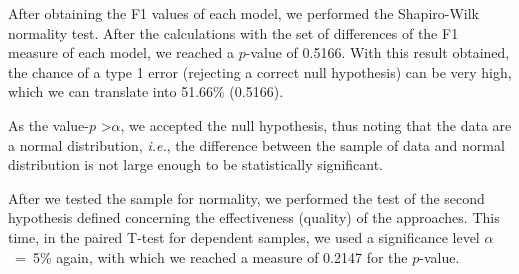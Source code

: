 After obtaining the F1 values of each model, we performed the Shapiro-Wilk normality test.
After the calculations with the set of differences of the F1 measure of each model, we reached a $p$-value of 0.5166.
With this result obtained, the chance of a type 1 error (rejecting a correct null hypothesis) can be very high, which we can translate into 51.66\% (0.5166).

As the value-$p$ \textgreater $\alpha$, we accepted the null hypothesis, thus noting that the data are a normal distribution, \textit{i.e.}, the difference between the sample of data and normal distribution is not large enough to be statistically significant.

After we tested the sample for normality, we performed the test of the second hypothesis defined concerning the effectiveness (quality) of the approaches.
This time, in the paired T-test for dependent samples, we used a significance level $\alpha$~=~5\% again, with which we reached a measure of 0.2147 for the $p$-value.

